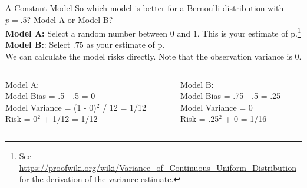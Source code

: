 \documentclass[aspectratio=169]{../latex_main/tntbeamer}  %
\begin{document}
	
	\begin{frame}[c]{A Constant Model}
	    So which model is better for a Bernoulli distribution with $p=.5$? Model A or Model B?\\
	    \bigskip
	    \textbf{Model A:} Select a random number between $0$ and $1$. This is your estimate of p.\footnote{See \url{https://proofwiki.org/wiki/Variance_of_Continuous_Uniform_Distribution} for the derivation of the variance estimate.}\\
        \textbf{Model B:}: Select $.75$ as your estimate of p.\\
        \bigskip
        We can calculate the model risks directly. Note that the observation variance is 0.
        \begin{columns}
            \begin{column}{.4\textwidth}
                  Model A:\\
                  \bigskip
                  Model Bias = .5 - .5 = 0\\
                  Model Variance = (1 - 0)$^2$ / 12 = 1/12 \\
                  \bigskip
                  Risk = 0$^2$ + 1/12 = 1/12
            \end{column}
            
            
            \begin{column}{.4\textwidth}
                   Model B:\\
                  \bigskip
                  Model Bias = .75 - .5 = .25\\
                  Model Variance = 0\\

                  \bigskip
                  Risk = .25$^2$ + 0 = 1/16
 
            \end{column}
        \end{columns}

	\end{frame}
\end{document}
